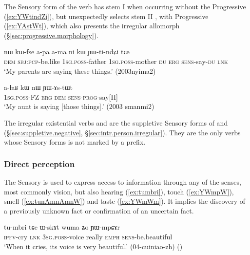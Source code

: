 The Sensory form of the verb  has stem I  when occurring without the Progressive (\ref{ex:YWtindZi}), but unexpectedly selects stem II ,  with Progressive (\ref{ex:YAstWt}), which also presents the irregular allomorph  (§\ref{sec:progressive.morphology}).
 

\begin{exe}
\ex \label{ex:YWtindZi}
\gll nɯ kɯ-fse a-pa a-ma ni kɯ ɲɯ-ti-ndʑi tɕe \\
\textsc{dem} \textsc{sbj}:\textsc{pcp}-be.like \textsc{1sg}.\textsc{poss}-father \textsc{1sg}.\textsc{poss}-mother \textsc{du} \textsc{erg} \textsc{sens}-say-\textsc{du} \textsc{lnk} \\
\glt `My parents are saying these things.' (2003nyima2)
\end{exe}

\begin{exe}
\ex \label{ex:YAstWt}
\gll a-ɬaʁ kɯ nɯ ɲɯ-ɤs-tɯt \\
\textsc{1sg}.\textsc{poss}-FZ \textsc{erg} \textsc{dem} \textsc{sens}-\textsc{prog}-say[II] \\
\glt `My aunt is saying [those things].' (2003 smanmi2)
\end{exe}

The irregular existential verbs  and  are the suppletive Sensory forms of  and  (§\ref{sec:suppletive.negative}, §\ref{sec:intr.person.irregular}). They are the only verbs whose Sensory forms is not marked by a prefix. 



\subsubsection{Direct perception} \label{sec:sensory.evd}
The Sensory is used to express access to information \citep{tournadre14evidentiality} through any of the senses, most commonly vision, but also hearing (\ref{ex:tumbri}), touch (\ref{ex:YWmpW}), smell (\ref{ex:tunAmnAmnW}) and taste (\ref{ex:YWmWm}). It implies the discovery of a previously unknown fact or confirmation of an uncertain fact.

\begin{exe}
\ex \label{ex:tumbri}
\gll tu-mbri tɕe ɯ-skɤt wuma ʑo ɲɯ-mpɕɤr \\
\textsc{ipfv}-cry \textsc{lnk} \textsc{3sg}.\textsc{poss}-voice really \textsc{emph} \textsc{sens}-be.beautiful \\
\glt `When it cries, its voice is very beautiful.' (04-cuiniao-zh)
()
\end{exe}

